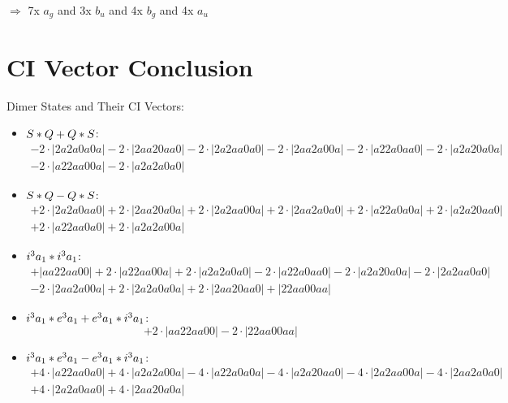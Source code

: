 \documentclass{article}
\begin{document}
$\Rightarrow{}$ 7x $a_{g}$ and 3x $b_u$ and 4x $b_g$ and 4x $a_{u}$


\newpage
\section{CI Vector Conclusion} 
Dimer States and Their CI Vectors:
\begin{itemize}
\item \boldmath$S * Q + Q * S \displaystyle $\unboldmath : \quad$$\begin{array}{c}
-2 \cdot \left|2a2a0a0a\right| -2 \cdot \left|2aa20aa0\right| -2 \cdot \left|2a2aa0a0\right| -2 \cdot \left|2aa2a00a\right| -2 \cdot \left|a22a0aa0\right| -2 \cdot \left|a2a20a0a\right| \\[0.5cm] -2 \cdot \left|a22aa00a\right| -2 \cdot \left|a2a2a0a0\right|
\end{array}$$
\item \boldmath$S * Q - Q * S \displaystyle $\unboldmath : \quad$$\begin{array}{c}
+2 \cdot \left|2a2a0aa0\right| +2 \cdot \left|2aa20a0a\right| +2 \cdot \left|2a2aa00a\right| +2 \cdot \left|2aa2a0a0\right| +2 \cdot \left|a22a0a0a\right| +2 \cdot \left|a2a20aa0\right| \\[0.5cm] +2 \cdot \left|a22aa0a0\right| +2 \cdot \left|a2a2a00a\right|
\end{array}$$
\item \boldmath$i^3 a_1 * i^3 a_1 \displaystyle $\unboldmath : \quad$$\begin{array}{c}
+\left|aa22aa00\right| +2 \cdot \left|a22aa00a\right| +2 \cdot \left|a2a2a0a0\right| -2 \cdot \left|a22a0aa0\right| -2 \cdot \left|a2a20a0a\right| -2 \cdot \left|2a2aa0a0\right| \\[0.5cm] -2 \cdot \left|2aa2a00a\right| +2 \cdot \left|2a2a0a0a\right| +2 \cdot \left|2aa20aa0\right| +\left|22aa00aa\right|
\end{array}$$
\item \boldmath$i^3 a_1 * e^3 a_1 + e^3 a_1 * i^3 a_1 \displaystyle $\unboldmath : \quad$$+2 \cdot \left|aa22aa00\right| -2 \cdot \left|22aa00aa\right|$$
\item \boldmath$i^3 a_1 * e^3 a_1 - e^3 a_1 * i^3 a_1 \displaystyle $\unboldmath : \quad$$\begin{array}{c}
+4 \cdot \left|a22aa0a0\right| +4 \cdot \left|a2a2a00a\right| -4 \cdot \left|a22a0a0a\right| -4 \cdot \left|a2a20aa0\right| -4 \cdot \left|2a2aa00a\right| -4 \cdot \left|2aa2a0a0\right| \\[0.5cm] +4 \cdot \left|2a2a0aa0\right| +4 \cdot \left|2aa20a0a\right|

\end{array}$$
\end{itemize}
\end{document}
